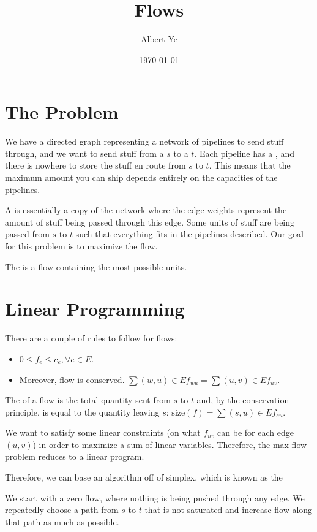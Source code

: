 \documentclass{article}
\title{Flows}
\author{Albert Ye}
\date{\today}
\begin{document}
\maketitle
\section{The Problem}
We have a directed graph representing a network of pipelines to send stuff through, and we want to send stuff from a  $s$ to a  $t$. Each pipeline has a , and there is nowhere to store the stuff en route from $s$ to $t$. This means that the maximum amount you can ship depends entirely on the capacities of the pipelines.

A  is essentially a copy of the network where the edge weights represent the amount of stuff being passed through this edge. Some units of stuff are being passed from $s$ to $t$ such that everything fits in the pipelines described. Our goal for this problem is to maximize the flow.

The  is a flow containing the most possible units.

\section{Linear Programming}
There are a couple of rules to follow for flows:
\begin{itemize}
    \item $0 \leq f_e \leq c_e, \forall e \in E$.
    \item Moreover, flow is conserved. $\sum{(w, u) \in E}{} f_{wu} = \sum{(u, v) \in E}{} f_{uv}$. 
\end{itemize}

The  of a flow is the total quantity sent from $s$ to $t$ and, by the conservation principle, is equal to the quantity leaving $s$: $\mathrm{size}(f) = \sum{(s, u) \in E}{} f_{su}$.

We want to satisfy some linear constraints (on what $f_{uv}$ can be for each edge $(u, v)$) in order to maximize a sum of linear variables. Therefore, the max-flow problem reduces to a linear program.

Therefore, we can base an algorithm off of simplex, which is known as the 

\begin{defn}
    We start with a zero flow, where nothing is being pushed through any edge. We repeatedly choose a path from $s$ to $t$ that is not saturated and increase flow along that path as much as possible.
\end{defn}
\end{document}
